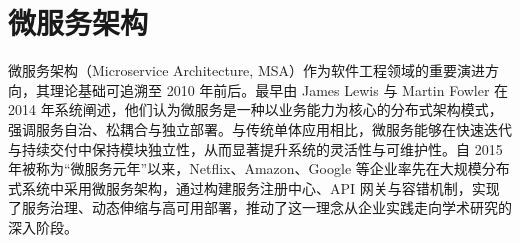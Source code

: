 \begin{table}[!htb]
    \caption{MIL-STD-6016相关标准对比分析表}
    \label{table_mil_std_comparison}
    \centering
\end{table}

\section{微服务架构}

微服务架构（Microservice Architecture, MSA）作为软件工程领域的重要演进方向，其理论基础可追溯至 2010 年前后。最早由 James Lewis 与 Martin Fowler 在 2014 年系统阐述，他们认为微服务是一种以业务能力为核心的分布式架构模式，强调服务自治、松耦合与独立部署。与传统单体应用相比，微服务能够在快速迭代与持续交付中保持模块独立性，从而显著提升系统的灵活性与可维护性。自 2015 年被称为“微服务元年”以来，Netflix、Amazon、Google 等企业率先在大规模分布式系统中采用微服务架构，通过构建服务注册中心、API 网关与容错机制，实现了服务治理、动态伸缩与高可用部署，推动了这一理念从企业实践走向学术研究的深入阶段。

